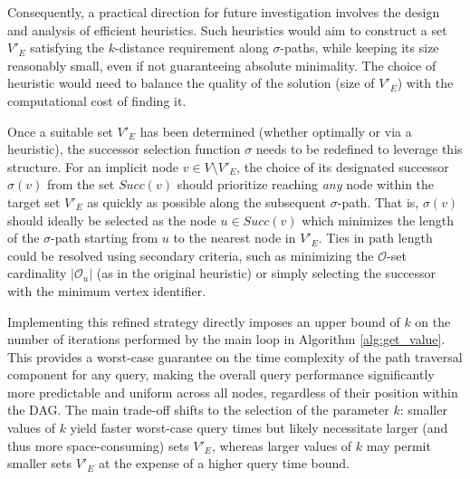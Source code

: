 Consequently, a practical direction for future investigation involves the design and analysis of efficient heuristics. Such heuristics would aim to construct a set $V'_E$ satisfying the $k$-distance requirement along $\sigma$-paths, while keeping its size reasonably small, even if not guaranteeing absolute minimality. The choice of heuristic would need to balance the quality of the solution (size of $V'_E$) with the computational cost of finding it.

Once a suitable set $V'_E$ has been determined (whether optimally or via a heuristic), the successor selection function $\sigma$ needs to be redefined to leverage this structure. For an implicit node $v \in V \setminus V'_E$, the choice of its designated successor $\sigma(v)$ from the set $Succ(v)$ should prioritize reaching \emph{any} node within the target set $V'_E$ as quickly as possible along the subsequent $\sigma$-path. That is, $\sigma(v)$ should ideally be selected as the node $u \in Succ(v)$ which minimizes the length of the $\sigma$-path starting from $u$ to the nearest node in $V'_E$. Ties in path length could be resolved using secondary criteria, such as minimizing the $\mathcal{O}$-set cardinality $|\mathcal{O}_u|$ (as in the original heuristic) or simply selecting the successor with the minimum vertex identifier.

Implementing this refined strategy directly imposes an upper bound of $k$ on the number of iterations performed by the main loop in Algorithm \ref{alg:get_value}. This provides a worst-case guarantee on the time complexity of the path traversal component for any \Rank{} query, making the overall query performance significantly more predictable and uniform across all nodes, regardless of their position within the DAG. The main trade-off shifts to the selection of the parameter $k$: smaller values of $k$ yield faster worst-case query times but likely necessitate larger (and thus more space-consuming) sets $V'_E$, whereas larger values of $k$ may permit smaller sets $V'_E$ at the expense of a higher query time bound.
